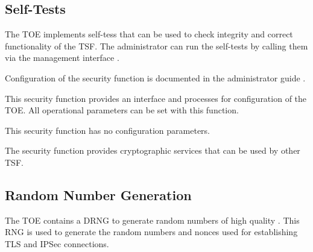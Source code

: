 
\subsection{Self-Tests}\label{sf.selfprotection.selftest}

The TOE implements self-tess that can be used to check integrity and correct
functionality of the TSF. The administrator can run the self-tests by calling
them via the management interface \lslanhttpmgmt{}.


%



Configuration of the security function is documented in the administrator guide
\autocite[Section~7]{agd_adm}.

\sfdescription{}

This security function provides an interface and processes for configuration of
the TOE. All operational parameters can be set with this function.

%



This security function has no configuration parameters.

\sfdescription{}

The security function provides cryptographic services that can be used by other TSF.

\subsection{Random Number Generation}%
\label{sf.cryptographicservices.rng}

The TOE contains a DRNG to generate random numbers of high quality
\autocite{SP80090A}. This RNG is used to generate the random numbers and nonces
used for establishing TLS and IPSec connections.



